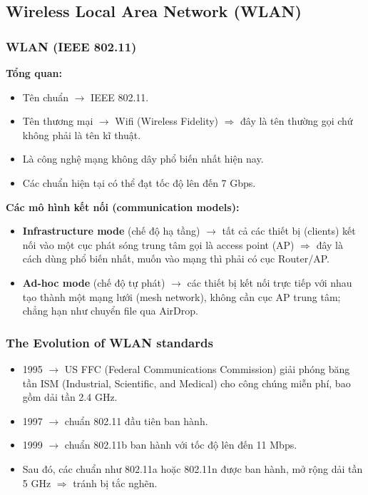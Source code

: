 \subsection{Wireless Local Area Network (WLAN)}

\subsubsection{WLAN (IEEE 802.11)}

\noindent
\textbf{Tổng quan:}

\begin{itemize}
    \item Tên chuẩn $\rightarrow$ IEEE 802.11.
    \item Tên thương mại $\rightarrow$ Wifi (Wireless Fidelity) $\Rightarrow$ đây là tên thường gọi chứ không phải là tên kĩ thuật.
    \item Là công nghệ mạng không dây phổ biến nhất hiện nay.
    \item Các chuẩn hiện tại có thể đạt tốc độ lên đến 7 Gbps.
\end{itemize}
\medskip

\noindent
\textbf{Các mô hình kết nối (communication models):}

\begin{itemize}
    \item \textbf{Infrastructure mode} (chế độ hạ tầng) $\rightarrow$ tất cả các thiết bị (clients) kết nối vào một cục phát sóng trung tâm gọi là access point (AP) $\Rightarrow$ đây là cách dùng phổ biến nhất, muốn vào mạng thì phải có cục Router/AP.
    \item \textbf{Ad-hoc mode} (chế độ tự phát) $\rightarrow$ các thiết bị kết nối trực tiếp với nhau tạo thành một mạng lưới (mesh network), không cần cục AP trung tâm; chẳng hạn như chuyển file qua AirDrop.
\end{itemize}

\subsubsection{The Evolution of WLAN standards}

\begin{itemize}
    \item 1995 $\rightarrow$ US FFC (Federal Communications Commission) giải phóng băng tần ISM (Industrial, Scientific, and Medical) cho công chúng miễn phí, bao gồm dải tần 2.4 GHz.
    \item 1997 $\rightarrow$ chuẩn 802.11 đầu tiên ban hành.
    \item 1999 $\rightarrow$ chuẩn 802.11b ban hành với tốc độ lên đến 11 Mbps.
    \item[$\rightarrow$] Sau đó, các chuẩn như 802.11a hoặc 802.11n được ban hành, mở rộng dải tần 5 GHz $\Rightarrow$ tránh bị tắc nghẽn.
\end{itemize}

